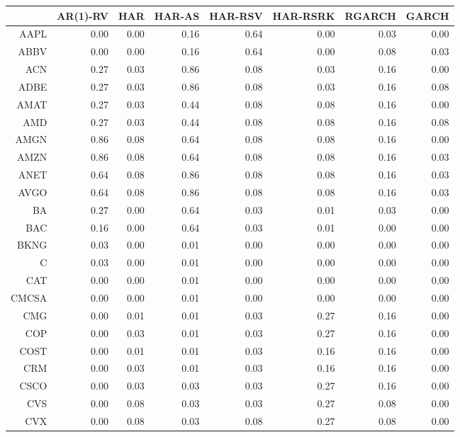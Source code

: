\begin{table}[ht]
\centering
\begin{tabular}{rrrrrrrr}
  \hline
 & AR(1)-RV & HAR & HAR-AS & HAR-RSV & HAR-RSRK & RGARCH & GARCH \\ 
  \hline
AAPL & 0.00 & 0.00 & 0.16 & 0.64 & 0.00 & 0.03 & 0.00 \\ 
  ABBV & 0.00 & 0.00 & 0.16 & 0.64 & 0.00 & 0.08 & 0.03 \\ 
  ACN & 0.27 & 0.03 & 0.86 & 0.08 & 0.03 & 0.16 & 0.00 \\ 
  ADBE & 0.27 & 0.03 & 0.86 & 0.08 & 0.03 & 0.16 & 0.08 \\ 
  AMAT & 0.27 & 0.03 & 0.44 & 0.08 & 0.08 & 0.16 & 0.00 \\ 
  AMD & 0.27 & 0.03 & 0.44 & 0.08 & 0.08 & 0.16 & 0.08 \\ 
  AMGN & 0.86 & 0.08 & 0.64 & 0.08 & 0.08 & 0.16 & 0.00 \\ 
  AMZN & 0.86 & 0.08 & 0.64 & 0.08 & 0.08 & 0.16 & 0.03 \\ 
  ANET & 0.64 & 0.08 & 0.86 & 0.08 & 0.08 & 0.16 & 0.03 \\ 
  AVGO & 0.64 & 0.08 & 0.86 & 0.08 & 0.08 & 0.16 & 0.03 \\ 
  BA & 0.27 & 0.00 & 0.64 & 0.03 & 0.01 & 0.03 & 0.00 \\ 
  BAC & 0.16 & 0.00 & 0.64 & 0.03 & 0.01 & 0.00 & 0.00 \\ 
  BKNG & 0.03 & 0.00 & 0.01 & 0.00 & 0.00 & 0.00 & 0.00 \\ 
  C & 0.03 & 0.00 & 0.01 & 0.00 & 0.00 & 0.00 & 0.00 \\ 
  CAT & 0.00 & 0.00 & 0.01 & 0.00 & 0.00 & 0.00 & 0.00 \\ 
  CMCSA & 0.00 & 0.00 & 0.01 & 0.00 & 0.00 & 0.00 & 0.00 \\ 
  CMG & 0.00 & 0.01 & 0.01 & 0.03 & 0.27 & 0.16 & 0.00 \\ 
  COP & 0.00 & 0.03 & 0.01 & 0.03 & 0.27 & 0.16 & 0.00 \\ 
  COST & 0.00 & 0.01 & 0.01 & 0.03 & 0.16 & 0.16 & 0.00 \\ 
  CRM & 0.00 & 0.03 & 0.01 & 0.03 & 0.16 & 0.16 & 0.00 \\ 
  CSCO & 0.00 & 0.03 & 0.03 & 0.03 & 0.27 & 0.16 & 0.00 \\ 
  CVS & 0.00 & 0.08 & 0.03 & 0.03 & 0.27 & 0.08 & 0.00 \\ 
  CVX & 0.00 & 0.08 & 0.03 & 0.08 & 0.27 & 0.08 & 0.00 \\ 

\end{tabular}
\end{table}
